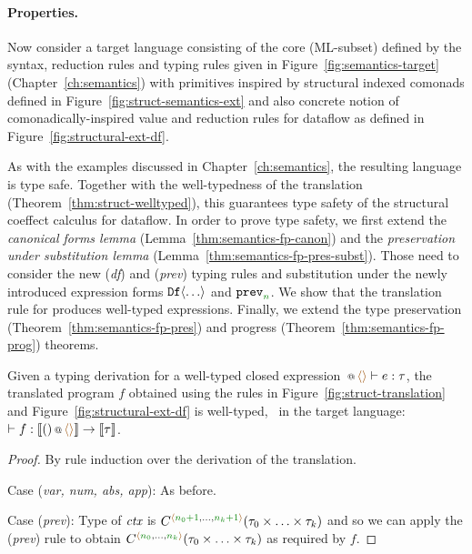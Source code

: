 \paragraph{Properties.}

Now consider a target language consisting of the core (ML-subset) defined by the syntax,
reduction rules and typing rules given in Figure~\ref{fig:semantics-target} (Chapter~\ref{ch:semantics})
with primitives inspired by structural indexed comonads defined in Figure~\ref{fig:struct-semantics-ext}
and also concrete notion of comonadically-inspired value and reduction rules for dataflow as
defined in Figure~\ref{fig:structural-ext-df}.

As with the examples discussed in Chapter~\ref{ch:semantics}, the resulting language is type safe.
Together with the well-typedness of the translation (Theorem~\ref{thm:struct-welltyped}), this
guarantees type safety of the structural coeffect calculus for dataflow.
In order to prove type safety, we first extend the \emph{canonical forms lemma}
(Lemma~\ref{thm:semantics-fp-canon}) and the \emph{preservation under substitution lemma}
(Lemma~\ref{thm:semantics-fp-pres-subst}). Those need to consider the new (\emph{df})
and (\emph{prev}) typing rules and substitution under the newly introduced expression forms
$\textnormal{\ttfamily Df}\langle\ldots\rangle$ and $\ident{prev}_{\cclrd{n}}$. We show that the translation
rule for  produces well-typed expressions. Finally, we extend the type preservation
(Theorem~\ref{thm:semantics-fp-pres}) and progress (Theorem~\ref{thm:semantics-fp-prog}) theorems.

\begin{theorem}
\label{thm:structural-df-welltyped}
Given a typing derivation for a well-typed closed expression $\coctx{}{\alift{}} \vdash e : \tau$,
the translated program $f$ obtained using the rules in Figure~\ref{fig:struct-translation}
and Figure~\ref{fig:structural-ext-df} is well-typed, \ie~in the target language: $\vdash f : \sem{\coctx{()}{\alift{}}} \rightarrow \sem{\tau}$.
\end{theorem}
\begin{proof}
By rule induction over the derivation of the translation.

\vspace{0.5em}\noindent\hangindent=0.6cm
Case (\emph{var, num, abs, app}): As before.

\vspace{0.5em}\noindent\hangindent=0.6cm
Case (\emph{prev}): Type of $\textit{ctx}$ is $\ctyp{\alift{\cclrd{n_0+1},\ldots,\cclrd{n_k+1}}}{(\tau_0\times\ldots\times\tau_k)}$
  and so we can apply the (\emph{prev}) rule to obtain $\ctyp{\alift{\cclrd{n_0},\ldots,\cclrd{n_k}}}{(\tau_0\times\ldots\times\tau_k)}$
  as required by $f$.
\end{proof}

